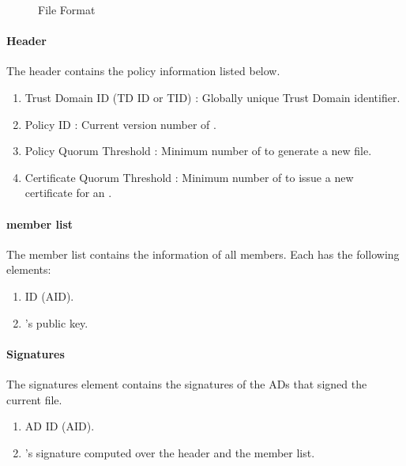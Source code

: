 \begin{figure}[h]
\centering
\begin{center}
\end{center}
\caption{\RT File Format}\label{fig:rot-file}
\end{figure}


\paragraph{Header}
The header contains the \TDC policy information listed below. 

\begin{enumerate}
\item Trust Domain ID (TD ID or TID) : Globally unique Trust Domain identifier.
\item Policy ID : Current version number of \PF.
\item Policy Quorum Threshold : Minimum number of \TDC \ADs to generate a new \RT file. 
\item Certificate Quorum Threshold : Minimum number of \TDC \ADs to issue a new certificate for an \AD.
\end{enumerate}

\paragraph{\TDC member list}
The \TDC member list contains the information of all \TDC members. Each \AD has the following elements:
\begin{enumerate}
\item \AD ID (AID).
\item \AD's public key.
\end{enumerate}

\paragraph{Signatures}
The signatures element contains the signatures of the \TDC ADs that signed the current \RT file.
\begin{enumerate}
\item AD ID (AID).
\item \AD's signature computed over the header and the \TDC member list.
\end{enumerate}

